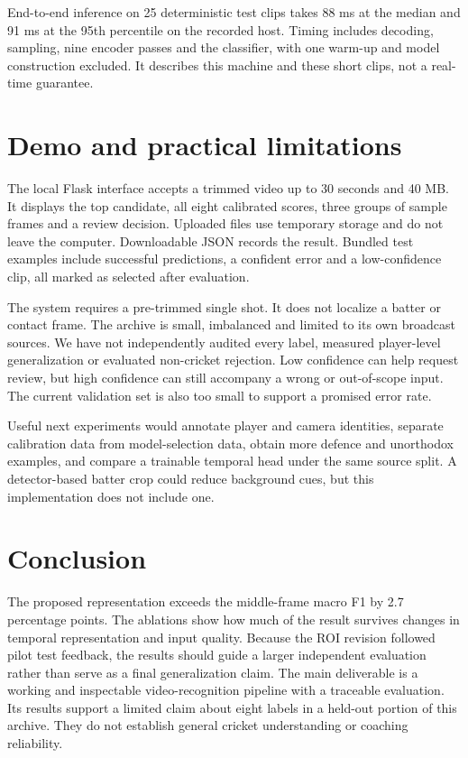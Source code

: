 End-to-end inference on 25 deterministic test clips takes 88 ms at the median and 91 ms at the 95th percentile on the recorded host. Timing includes decoding, sampling, nine encoder passes and the classifier, with one warm-up and model construction excluded. It describes this machine and these short clips, not a real-time guarantee.

\section{Demo and practical limitations}
The local Flask interface accepts a trimmed video up to 30 seconds and 40 MB. It displays the top candidate, all eight calibrated scores, three groups of sample frames and a review decision. Uploaded files use temporary storage and do not leave the computer. Downloadable JSON records the result. Bundled test examples include successful predictions, a confident error and a low-confidence clip, all marked as selected after evaluation.

The system requires a pre-trimmed single shot. It does not localize a batter or contact frame. The archive is small, imbalanced and limited to its own broadcast sources. We have not independently audited every label, measured player-level generalization or evaluated non-cricket rejection. Low confidence can help request review, but high confidence can still accompany a wrong or out-of-scope input. The current validation set is also too small to support a promised error rate.

Useful next experiments would annotate player and camera identities, separate calibration data from model-selection data, obtain more defence and unorthodox examples, and compare a trainable temporal head under the same source split. A detector-based batter crop could reduce background cues, but this implementation does not include one.

\section{Conclusion}
The proposed representation exceeds the middle-frame macro F1 by 2.7 percentage points. The ablations show how much of the result survives changes in temporal representation and input quality. Because the ROI revision followed pilot test feedback, the results should guide a larger independent evaluation rather than serve as a final generalization claim. The main deliverable is a working and inspectable video-recognition pipeline with a traceable evaluation. Its results support a limited claim about eight labels in a held-out portion of this archive. They do not establish general cricket understanding or coaching reliability.

